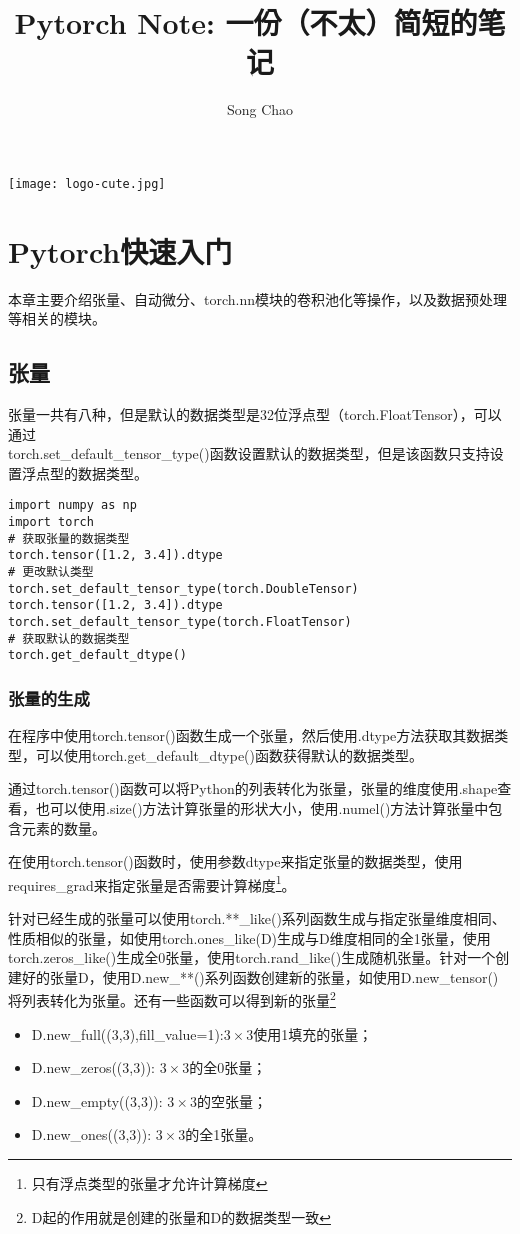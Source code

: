\documentclass[cn,hazy,blue,14pt,screen]{elegantnote}
\title{Pytorch Note: 一份（不太）简短的笔记}
\author{Song Chao}
\date{\zhtoday}
\begin{document}
\maketitle

\centerline{
  \texttt{[image: logo-cute.jpg]}
}

\section{Pytorch快速入门}

本章主要介绍张量、自动微分、torch.nn模块的卷积池化等操作，以及数据预处理等相关的模块。

\subsection{张量}

张量一共有八种，但是默认的数据类型是32位浮点型（torch.FloatTensor），可以通过\\torch.set\_default\_tensor\_type()函数设置默认的数据类型，但是该函数只支持设置浮点型的数据类型。
\begin{lstlisting}
import numpy as np
import torch
# 获取张量的数据类型
torch.tensor([1.2, 3.4]).dtype
# 更改默认类型
torch.set_default_tensor_type(torch.DoubleTensor)
torch.tensor([1.2, 3.4]).dtype
torch.set_default_tensor_type(torch.FloatTensor)
# 获取默认的数据类型
torch.get_default_dtype()
\end{lstlisting}

\subsubsection{张量的生成}

在程序中使用torch.tensor()函数生成一个张量，然后使用.dtype方法获取其数据类型，可以使用torch.get\_default\_dtype()函数获得默认的数据类型。

通过torch.tensor()函数可以将Python的列表转化为张量，张量的维度使用.shape查看，也可以使用.size()方法计算张量的形状大小，使用.numel()方法计算张量中包含元素的数量。

在使用torch.tensor()函数时，使用参数dtype来指定张量的数据类型，使用requires\_grad来指定张量是否需要计算梯度\footnote{只有浮点类型的张量才允许计算梯度}。

针对已经生成的张量可以使用torch.**\_like()系列函数生成与指定张量维度相同、性质相似的张量，如使用torch.ones\_like(D)生成与D维度相同的全1张量，使用torch.zeros\_like()生成全0张量，使用torch.rand\_like()生成随机张量。针对一个创建好的张量D，使用D.new\_**()系列函数创建新的张量，如使用D.new\_tensor()将列表转化为张量。还有一些函数可以得到新的张量\footnote{D起的作用就是创建的张量和D的数据类型一致}
\begin{itemize}
  \item D.new\_full((3,3),fill\_value=1):$3\times 3$使用1填充的张量；
  \item D.new\_zeros((3,3)): $3\times 3$的全0张量；
  \item D.new\_empty((3,3)): $3\times 3$的空张量；
  \item D.new\_ones((3,3)): $3\times 3$的全1张量。
\end{itemize}
\end{document}
